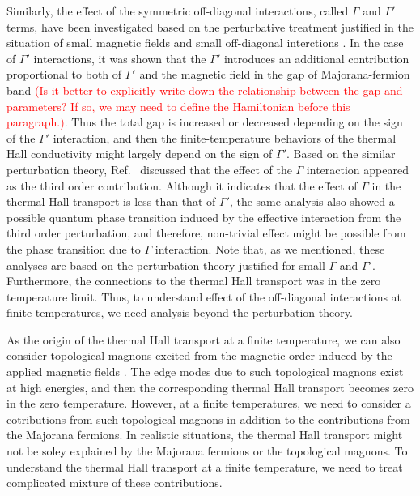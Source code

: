 \documentclass[reprint,amsmath,amssymb,aps,prx]{revtex4-2}
\begin{document}
Similarly, the effect of the symmetric off-diagonal interactions, called $\Gamma$ and $\Gamma'$ terms, have been investigated based on the perturbative treatment justified in the situation of small magnetic fields and small off-diagonal interctions \cite{TakikawaF2020, YamadaF2021}. In the case of $\Gamma'$ interactions, it was shown that the $\Gamma'$ introduces an additional contribution proportional to both of $\Gamma'$ and the magnetic field in the gap of Majorana-fermion band \textcolor{red}{(Is it better to explicitly write down the relationship between the gap and parameters? If so, we may need to define the Hamiltonian before this paragraph.)}\cite{TakikawaF2020}. Thus the total gap is increased or decreased depending on the sign of the $\Gamma'$ interaction, and then the finite-temperature behaviors of the thermal Hall conductivity might largely depend on the sign of $\Gamma'$. Based on the similar perturbation theory, Ref.~\cite{YamadaF2021} discussed that the effect of the $\Gamma$ interaction appeared as the third order contribution. Although it indicates that the effect of $\Gamma$ in the thermal Hall transport is less than that of $\Gamma'$, the same analysis also showed a possible quantum phase transition induced by the effective interaction from the third order perturbation, and therefore, non-trivial effect might be possible from the phase transition due to $\Gamma$ interaction. Note that, as we mentioned, these analyses are based on the perturbation theory justified for small $\Gamma$ and $\Gamma'$. Furthermore, the connections to the thermal Hall transport was in the zero temperature limit. Thus, to understand effect of the off-diagonal interactions at finite temperatures, we need analysis beyond the perturbation theory.

As the origin of the thermal Hall transport at a finite temperature, we can also consider topological magnons excited from the magnetic order induced by the applied magnetic fields \cite{McClartyDGRPMP2018,Joshi2018}. The edge modes due to such topological magnons exist at high energies, and then the corresponding thermal Hall transport becomes zero in the zero temperature. However, at a finite temperatures, we need to consider a cotributions from such topological magnons in addition to the contributions from the Majorana fermions. In realistic situations, the thermal Hall transport might not be soley explained by the Majorana fermions or the topological magnons. To understand the thermal Hall transport at a finite temperature, we need to treat complicated mixture of these contributions. 
\end{document}
